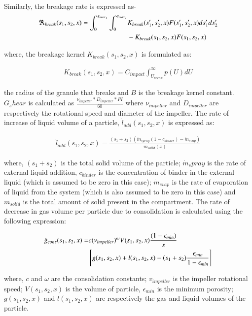 \documentclass[preprint,10pt,authoryear]{elsarticle}
\begin{document}
\begin{linenumbers}
Similarly, the breakage rate is expressed as-
\begin{align}
\Re_{break}(s_1,s_2,x)  = \int_0^{s_{max_1}} \int_0^{s_{max_2}} & \notag
K_{break}(s_1',s_2',x)F(s_1',s_2',x)ds_1'ds_2' \\ &  - K_{break}(s_1,s_2,x)F(s_1,s_2,x) 
\end{align}
	    
where, the breakage kernel $K_{break}(s_1,s_2,x)$ is formulated as: 

\begin{align}
K_{break}(s_1,s_2,x) = C_{impact}\int_{U_{break}}^{\infty}p(U)dU	    
\end{align}


the radius of the granule that breaks and $B$ is the breakage kernel constant. $G_shear$ is 
calculated as $\frac{\nu_{impeller}*D_{impeller}*PI}{60}$ where $\nu_{impeller}$ and $D_{impeller}$ 
are respectively the rotational speed and diameter of the impeller.
The rate of increase of liquid volume of a particle, $\dot{l}_{add}(s_1,s_2,x)$ is expressed as:

\begin{align}
\dot{l}_{add}(s_1,s_2,x) = \frac{(s_1+s_2)(\dot{m}_{spray}(1-c_{binder})-\dot{m}_{evap})}{m_{solid}(x)}
\label{eqn:mthds_liq_addn_rate}
\end{align}

where, $(s_1+s_2)$  is the total solid volume of the particle; $\dot{m}_spray$ is the rate of external 
liquid addition, $c_{binder}$ is the concentration of binder in the external liquid (which is assumed to 
be zero in this case); $\dot{m}_{evap}$ is the rate of evaporation of liquid from 
the system (which is also assumed to be zero in this case) and $m_{solid}$ is the total amount of solid 
present in the compartment.
The rate of decrease in gas volume per particle due to consolidation is calculated using the 
following expression: \citep{Verkoeijen2002} 

\begin{align}
\dot{g}_{cons}(s_1,s_2,x)=&c (\nu_{impeller})^{\omega}V(s_1,s_2,x)\frac{(1-\epsilon_{min})}{s} 
\notag \\ 
& \left[g(s_1,s_2,x)+l(s_1,s_2,x) -(s_1+s_2)\frac{\epsilon_{min}}{1-\epsilon_{min}}\right]
\label{eqn:mthds_rate_gas_vol_part}
\end{align}        

 where, $c$ and $\omega$ are the consolidation constants; $v_{impeller}$ is the impeller 
rotational speed; $V(s_1,s_2,x)$ is the volume of particle, $\epsilon_{min}$ is the minimum porosity; 
$g(s_1,s_2,x)$ and $l(s_1,s_2,x)$ are respectively the gas and liquid volumes of the particle.


\end{linenumbers}
\end{document}
